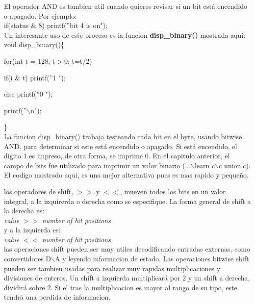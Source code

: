\documentclass[]{article}
\begin{document}
			El operador AND  es tambien util cuando quieres revisar si un bit está encendido o apagado. Por ejemplo:\\
			
			if(status \& 8) printf(''bit 4 is on");\\
			
			Un interesante uso de este proceso es la funcion \textbf{disp\_binary()} mostrada aqui:\\
			
			void disp\_binary()\{
			
			for(int t = 128; t$>$0; t=t/2)
			
			if(i \& t) printf(''1 ");
			
			else printf(''0 ");
			
			printf(''$\backslash$n");
			
			\}\\
			
			La funcion disp\_binary() trabaja testeando cada bit en el byte, usando bitwise AND, para determinar si este está encendido o apagado. Si está encendido, el digito 1 es impreso, de otra forma, se imprime 0. En el capitulo anterior, el campo de bits fue utilizado para imprimir un valor binario (...$\backslash$learn c$\backslash$c union.c). El codigo mostrado aqui, es una mejor alternativa pues es mas rapido y pequeño.
			
			los operadores de shift, $>>$ y $<<$, mueven todos los bits en un valor integral, a la izquirerda o derecha como se especifique. La forma general de shift a la derecha es:\\
			
			\textit{value} $>>$ \textit{number of bit positions}\\
			
			y a la izquierda es:\\
			
			\textit{value} $<<$ \textit{number of bit positions}\\
			
			las operaciones shift pueden ser muy utiles decodificando entradas externas, como convertidores D$\backslash$A y leyendo informacion de estado. Las operaciones bitwise shift pueden ser tambien usadas para realizar muy rapidas multiplicaciones y divisiones de enteros. Un shift a izquierda multiplicará por 2 y un shift a derecha, dividirá sobre 2. Si el tras la multiplicacion es mayor al rango de su tipo, este tendrá una perdida de informacion.\\
			
\end{document}
